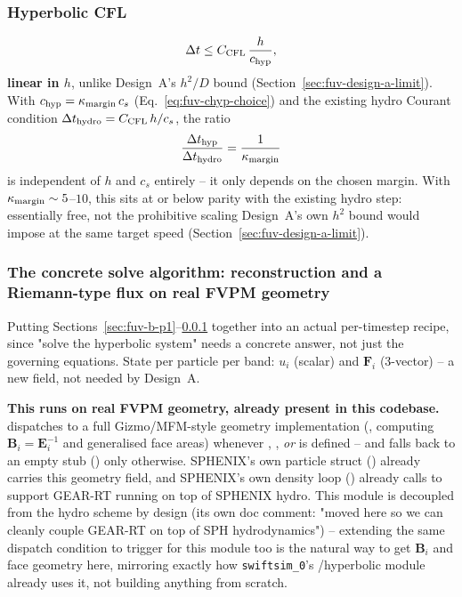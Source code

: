 \subsubsection{Hyperbolic CFL}
\label{sec:fuv-b-cfl}

\begin{equation}
  \Delta t \le C_{\rm CFL}\,\frac{h}{c_{\rm hyp}} ,
  \label{eq:fuv-hyperbolic-cfl}
\end{equation}
\textbf{linear in $h$}, unlike Design~A's $h^2/D$ bound
(Section~\ref{sec:fuv-design-a-limit}). With $c_{\rm hyp}=\kappa_{\rm
margin}\,c_s$ (Eq.~\ref{eq:fuv-chyp-choice}) and the existing hydro
Courant condition $\Delta t_{\rm hydro}=C_{\rm CFL}\,h/c_s$, the ratio
\begin{equation}
  \frac{\Delta t_{\rm hyp}}{\Delta t_{\rm hydro}} = \frac{1}{\kappa_{\rm margin}}
  \label{eq:fuv-cfl-ratio}
\end{equation}
is independent of $h$ and $c_s$ entirely -- it only depends on the
chosen margin. With $\kappa_{\rm margin}\sim5$--$10$, this sits at or
below parity with the existing hydro step: essentially free, not the
prohibitive scaling Design~A's own $h^2$ bound would impose at the same
target speed (Section~\ref{sec:fuv-design-a-limit}).

\subsubsection{The concrete solve algorithm: reconstruction and a
Riemann-type flux on real FVPM geometry}
\label{sec:fuv-b-algorithm}

Putting Sections~\ref{sec:fuv-b-p1}--\ref{sec:fuv-b-cfl} together into
an actual per-timestep recipe, since "solve the hyperbolic system"
needs a concrete answer, not just the governing equations. State per
particle per band: $u_i$ (scalar) and $\mathbf F_i$ (3-vector) -- a
new field, not needed by Design~A.

\textbf{This runs on real FVPM geometry, already present in this
codebase.}  dispatches to a full
Gizmo/MFM-style geometry implementation
(, computing $\mathbf B_i=\mathbf
E_i^{-1}$ and generalised face areas) whenever ,
, \emph{or}  is defined -- and
falls back to an empty stub () only
otherwise. SPHENIX's own particle struct
() already carries this geometry
field, and SPHENIX's own density loop
() already calls
 to support GEAR-RT
running on top of SPHENIX hydro. This module is decoupled from the
hydro scheme by design (its own doc comment: "moved here so we can
cleanly couple GEAR-RT on top of SPH hydrodynamics") -- extending the
same dispatch condition to trigger for this module too is the natural
way to get $\mathbf B_i$ and face geometry here, mirroring exactly how
\texttt{swiftsim\_0}'s /hyperbolic module
already uses it, not building anything from scratch.

